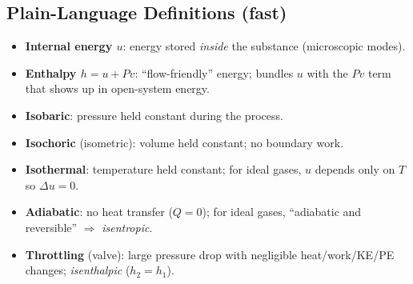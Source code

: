 \documentclass[10pt]{article}
\begin{document}
\begin{multicols}{2}
\subsection{Plain-Language Definitions (fast)}
\begin{itemize}
    \item \textbf{Internal energy $u$}: energy stored \emph{inside} the substance (microscopic modes).
    \item \textbf{Enthalpy $h=u+Pv$}: “flow-friendly” energy; bundles $u$ with the $Pv$ term that shows up in open-system energy.
    \item \textbf{Isobaric}: pressure held constant during the process.
    \item \textbf{Isochoric} (isometric): volume held constant; no boundary work.
    \item \textbf{Isothermal}: temperature held constant; for ideal gases, $u$ depends only on $T$ so $\Delta u=0$.
    \item \textbf{Adiabatic}: no heat transfer ($Q=0$); for ideal gases, “adiabatic and reversible” $\Rightarrow$ \emph{isentropic}.
    \item \textbf{Throttling} (valve): large pressure drop with negligible heat/work/KE/PE changes; \emph{isenthalpic} ($h_2=h_1$).
\end{itemize}

\end{multicols}
\end{document}
